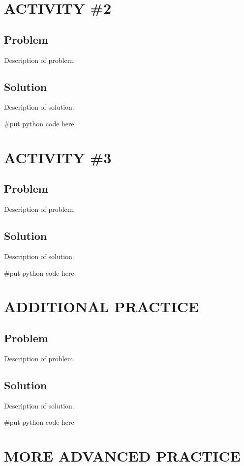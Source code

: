 \documentclass[14pt]{extreport}%
\begin{document}
\section*{ACTIVITY \#2} 
\subsection*{Problem}
Description of problem.

\subsection*{Solution}
Description of solution.\\
\begin{python}
#put python code here
\end{python}

\section*{ACTIVITY \#3} 
\subsection*{Problem}
Description of problem.
\subsection*{Solution}
Description of solution. \\
\begin{python}
#put python code here
\end{python}

\section*{ADDITIONAL PRACTICE} 
\subsection*{Problem}
Description of problem.
\subsection*{Solution}
Description of solution. \\
\begin{python}
#put python code here
\end{python}

\section*{MORE ADVANCED PRACTICE} 
\end{document}
